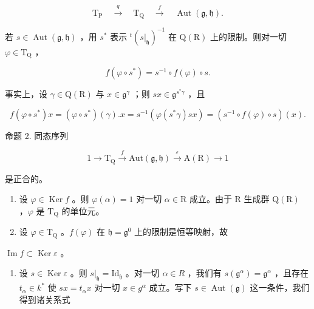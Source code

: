 \[
\mathrm{T} _ {\mathrm{P}} \quad \stackrel {{q}} {{\longrightarrow}} \quad \mathrm{T} _ {\mathrm{Q}} \quad \stackrel {{f}} {{\longrightarrow}} \quad \operatorname{Aut} (\mathfrak {g}, \mathfrak {h}).
\]

若 \(s \in \operatorname{Aut}(\mathfrak{g}, \mathfrak{h})\) ，用 \(s^*\) 表示 \({}^t(s|_{\mathfrak{h}})^{-1}\) 在 \(\mathrm{Q}(\mathrm{R})\) 上的限制。则对一切 \(\varphi \in \mathrm{T}_{\mathrm{Q}}\) ，

\[
f (\varphi \circ s ^ {*}) = s ^ {- 1} \circ f (\varphi) \circ s.\tag{1}
\]

事实上，设 \(\gamma \in \mathrm{Q}(\mathrm{R})\) 与 \(x\in \mathfrak{g}^{\gamma}\) ；则 \(sx\in \mathfrak{g}^{s^{*}\gamma}\) ，且

\[
f (\varphi \circ s ^ {*}) x = (\varphi \circ s ^ {*}) (\gamma). x = s ^ {- 1} (\varphi (s ^ {*} \gamma) s x) = (s ^ {- 1} \circ f (\varphi) \circ s) (x).
\]

命题 2. 同态序列

\[
1 \longrightarrow \mathrm {T_ {Q}} \stackrel {f} {\longrightarrow} \mathrm{Aut} (\mathfrak {g}, \mathfrak {h}) \stackrel {\varepsilon} {\longrightarrow} \mathrm{A(R)} \longrightarrow 1
\]

是正合的。

\begin{enumerate}
\def\labelenumi{\alph{enumi})}
\item
  设 \(\varphi \in \operatorname{Ker} f\) 。则 \(\varphi(\alpha) = 1\) 对一切 \(\alpha \in \mathrm{R}\) 成立。由于 \(\mathrm{R}\) 生成群 \(\mathrm{Q}(\mathrm{R})\) ，\(\varphi\) 是 \(\mathrm{T}_{\mathrm{Q}}\) 的单位元。
\item
  设 \(\varphi \in \mathrm{T}_{\mathrm{Q}}\) 。\(f(\varphi)\) 在 \(\mathfrak{h} = \mathfrak{g}^0\) 上的限制是恒等映射，故
\end{enumerate}

\(\operatorname{Im} f \subset \operatorname{Ker} \varepsilon\) 。

\begin{enumerate}
\def\labelenumi{\alph{enumi})}
\setcounter{enumi}{2}
\tightlist
\item
  设 \(s \in \operatorname{Ker} \varepsilon\) 。则 \(s|_{\mathfrak{h}} = \mathrm{Id}_{\mathfrak{h}}\) 。对一切 \(\alpha \in R\) ，我们有 \(s(\mathfrak{g}^{\alpha}) = \mathfrak{g}^{\alpha}\) ，且存在 \(t_{\alpha} \in k^{*}\) 使 \(sx = t_{\alpha}x\) 对一切 \(x \in g^{\alpha}\) 成立。写下 \(s \in \operatorname{Aut}(\mathfrak{g})\) 这一条件，我们得到诸关系式
\end{enumerate}

